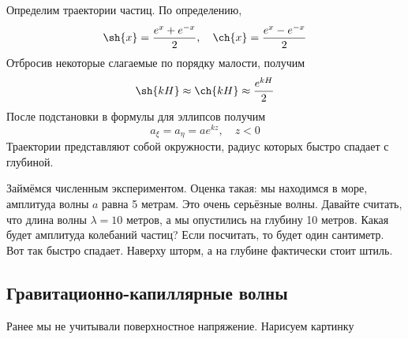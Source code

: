 Определим траектории частиц. По определению, 
\begin{equation}
    \sh{x} = \frac{e^x+e^{-x}}{2}, \quad \ch{x} = \frac{e^x-e^{-x}}{2}
\end{equation}
Отбросив некоторые слагаемые по порядку малости, получим
\begin{equation}
    \sh{kH}\approx\ch{kH}\approx \frac{e^{kH}}{2} 
\end{equation}
После подстановки в формулы для эллипсов получим
\begin{equation}
    a_\xi = a_\eta = ae^{kz}, \quad z<0
\end{equation}
Траектории представляют собой окружности, радиус которых быстро спадает с глубиной. 

Займёмся численным экспериментом. 
Оценка такая: мы находимся в море, амплитуда волны $a$ равна 5 метрам.
Это очень серьёзные волны. 
Давайте считать, что длина волны $\lambda=10$  метров, а мы опустились на глубину 10 метров.
Какая будет амплитуда колебаний частиц? Если посчитать, то будет один сантиметр. Вот так быстро спадает. Наверху шторм, а на глубине фактически стоит штиль.



\newpage
\subsection{Гравитационно-капиллярные волны}
Ранее мы не учитывали поверхностное напряжение. Нарисуем картинку

